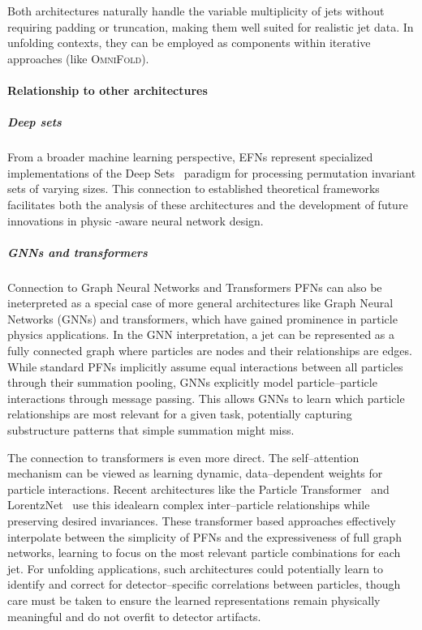         Both architectures naturally handle the variable multiplicity of jets without requiring padding or truncation, making them well suited for realistic jet data.
        In unfolding contexts, they can be employed as components within iterative approaches (like \textsc{OmniFold}).

        \paragraph{Relationship to other architectures}
            \subparagraph{Deep sets}
                From a broader machine learning perspective, EFNs represent specialized implementations of the Deep Sets~\cite{Sauer2023MeasurementCollider} paradigm for processing permutation invariant sets of varying sizes.
                This connection to established theoretical frameworks facilitates both the analysis of these architectures and the development of future innovations in physic -aware neural network design.
            \subparagraph{GNNs and transformers}
                Connection to Graph Neural Networks and Transformers
                    PFNs can also be ineterpreted as a special case of more general architectures like Graph Neural Networks (GNNs) and transformers, which have gained prominence in particle physics applications.
                    In the GNN interpretation, a jet can be represented as a fully connected graph where particles are nodes and their relationships are edges.
                    While standard PFNs implicitly assume equal interactions between all particles through their summation pooling, GNNs explicitly model particle--particle interactions through message passing.
                    This allows GNNs to learn which particle relationships are most relevant for a given task, potentially capturing substructure patterns that simple summation might miss.
                    
                    The connection to transformers is even more direct.
                    The self--attention mechanism can be viewed as learning dynamic, data--dependent weights for particle interactions.
                    Recent architectures like the Particle Transformer~\cite{Qu2022ParticleTagging} and LorentzNet~\cite{GongAnTagging} use this idealearn complex inter--particle relationships while preserving desired invariances.
                    These transformer based approaches effectively interpolate between the simplicity of PFNs and the expressiveness of full graph networks, learning to focus on the most relevant particle combinations for each jet.
                    For unfolding applications, such architectures could potentially learn to identify and correct for detector--specific correlations between particles, though care must be taken to ensure the learned representations remain physically meaningful and do not overfit to detector artifacts.


